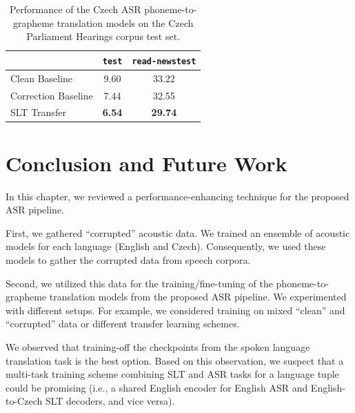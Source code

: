 \begin{table}[t]
	\centering
	\begin{tabular}{l|cc}
		&  \texttt{test} & \texttt{read-newstest} \\ \midrule
		Clean Baseline             & 9.60       &     33.22         \\
		
		Correction Baseline             & 7.44   & 32.55           \\
		
		SLT Transfer     & \textbf{6.54}   & \textbf{29.74}  \\
	\end{tabular}   
	\caption{Performance of the Czech ASR phoneme-to-grapheme translation models on the Czech Parliament Hearings corpus test set.}
	\label{tab:werstrain_cs}
\end{table}


\section{Conclusion and Future Work}
In this chapter, we reviewed a performance-enhancing technique for the proposed ASR pipeline.

First, we gathered ``corrupted'' acoustic data. We trained an ensemble of acoustic models for each language (English and Czech). Consequently, we used these models to gather the corrupted data from speech corpora.

Second, we utilized this data for the training/fine-tuning of the phoneme-to-grapheme translation models from the proposed ASR pipeline. We experimented with different setups. For example, we considered training on mixed ``clean'' and ``corrupted'' data or different transfer learning schemes.

We observed that training-off the checkpoints from the spoken language translation task is the best option. Based on this observation, we suspect that a multi-task training scheme combining SLT and ASR tasks for a language tuple could be promising (i.e., a shared English encoder for English ASR and English-to-Czech SLT decoders, and vice versa).

